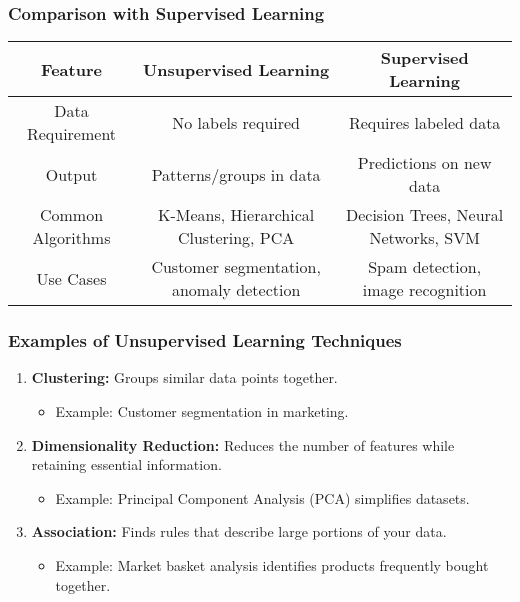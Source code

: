 \documentclass[aspectratio=169]{beamer}
\begin{document}
\begin{frame}[fragile]
    \frametitle{Comparison with Supervised Learning}
    \begin{tabular}{|c|c|c|}
        \hline
        \textbf{Feature} & \textbf{Unsupervised Learning} & \textbf{Supervised Learning} \\
        \hline
        Data Requirement & No labels required & Requires labeled data \\
        \hline
        Output & Patterns/groups in data & Predictions on new data \\
        \hline
        Common Algorithms & K-Means, Hierarchical Clustering, PCA & Decision Trees, Neural Networks, SVM \\
        \hline
        Use Cases & Customer segmentation, anomaly detection & Spam detection, image recognition \\
        \hline
    \end{tabular}
\end{frame}

\begin{frame}[fragile]
    \frametitle{Examples of Unsupervised Learning Techniques}
    \begin{enumerate}
        \item \textbf{Clustering:} Groups similar data points together.
              \begin{itemize}
                  \item Example: Customer segmentation in marketing.
              \end{itemize}
              
        \item \textbf{Dimensionality Reduction:} Reduces the number of features while retaining essential information.
              \begin{itemize}
                  \item Example: Principal Component Analysis (PCA) simplifies datasets.
              \end{itemize}
              
        \item \textbf{Association:} Finds rules that describe large portions of your data.
              \begin{itemize}
                  \item Example: Market basket analysis identifies products frequently bought together.
              \end{itemize}
    \end{enumerate}
\end{frame}
\end{document}
